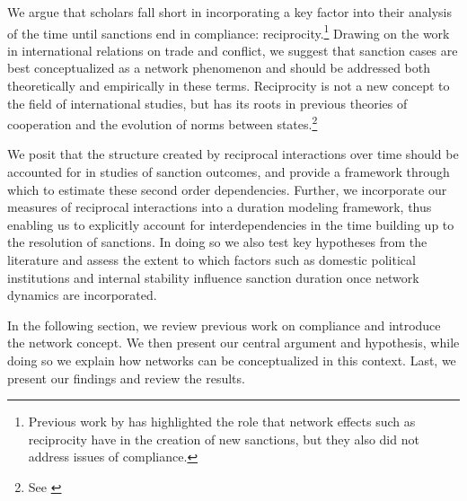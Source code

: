 We argue that scholars fall short in incorporating a key factor into their analysis of the time until sanctions end in compliance: reciprocity.\footnote{Previous work by \cite{cranmer2014reciprocity} has highlighted the role that network effects such as reciprocity have in the creation of new sanctions, but they also did not address issues of compliance.} Drawing on the work in international relations on trade and conflict, we suggest that sanction cases are best conceptualized as a network phenomenon and should be addressed both theoretically and empirically in these terms. Reciprocity is not a new concept to the field of international studies, but has its roots in previous theories of cooperation and the evolution of norms between states.\footnote{See \cite{choucri:north:1972,goldstein1991reciprocity, richardsonai:1960, ward1992reciprocity}} 


We posit that the structure created by reciprocal interactions over time should be accounted for in studies of sanction outcomes, and provide a framework through which to estimate these second order dependencies. Further, we incorporate our measures of reciprocal interactions into a duration modeling framework, thus enabling us to explicitly account for interdependencies in the time building up to the resolution of sanctions. In doing so we also test key hypotheses from the literature and assess the extent to which factors such as domestic political institutions and internal stability influence sanction duration once network dynamics are incorporated.  

In the following section, we review previous work on compliance and introduce the network concept. We then present our central argument and hypothesis, while doing so we explain how networks can be conceptualized in this context. Last, we present our findings and review the results.

